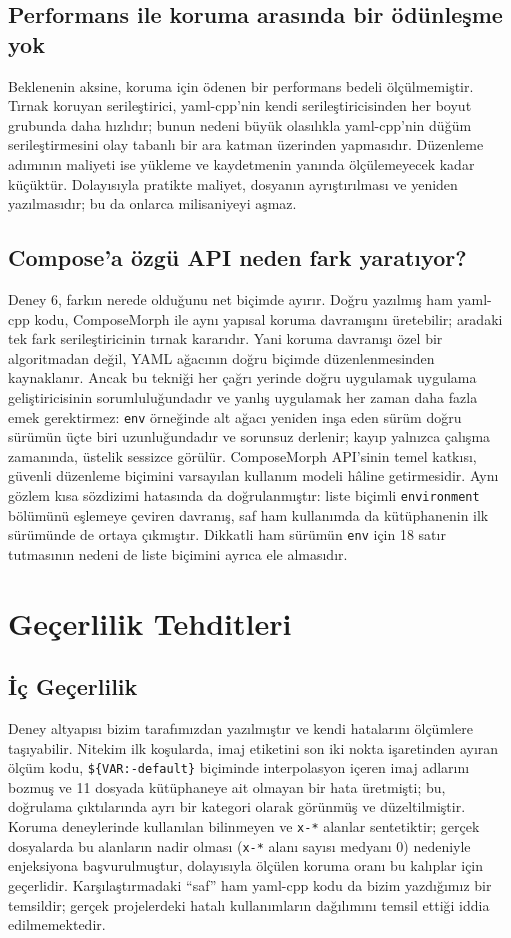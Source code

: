 \documentclass[conference]{IEEEtran}
\begin{document}
\subsection{Performans ile koruma arasında bir ödünleşme yok}
Beklenenin aksine, koruma için ödenen bir performans bedeli ölçülmemiştir.
Tırnak koruyan serileştirici, yaml-cpp'nin kendi serileştiricisinden her
boyut grubunda daha hızlıdır; bunun nedeni büyük olasılıkla yaml-cpp'nin
düğüm serileştirmesini olay tabanlı bir ara katman üzerinden yapmasıdır.
Düzenleme adımının maliyeti ise yükleme ve kaydetmenin yanında ölçülemeyecek
kadar küçüktür. Dolayısıyla pratikte maliyet, dosyanın ayrıştırılması ve
yeniden yazılmasıdır; bu da onlarca milisaniyeyi aşmaz.

\subsection{Compose'a özgü API neden fark yaratıyor?}
Deney 6, farkın nerede olduğunu net biçimde ayırır. Doğru yazılmış ham
yaml-cpp kodu, ComposeMorph ile aynı yapısal koruma davranışını üretebilir;
aradaki tek fark serileştiricinin tırnak kararıdır. Yani koruma davranışı özel bir algoritmadan değil, YAML ağacının doğru biçimde düzenlenmesinden kaynaklanır. Ancak bu
tekniği her çağrı yerinde doğru uygulamak uygulama geliştiricisinin sorumluluğundadır
ve yanlış uygulamak her zaman daha fazla emek gerektirmez: \texttt{env}
örneğinde alt ağacı yeniden inşa eden sürüm doğru sürümün üçte biri
uzunluğundadır ve sorunsuz derlenir; kayıp yalnızca çalışma zamanında,
üstelik sessizce görülür.
ComposeMorph API'sinin temel katkısı, güvenli düzenleme biçimini varsayılan kullanım modeli hâline getirmesidir.
Aynı gözlem kısa sözdizimi hatasında da doğrulanmıştır: liste biçimli
\texttt{environment} bölümünü eşlemeye çeviren davranış, saf ham
kullanımda da kütüphanenin ilk sürümünde de ortaya çıkmıştır. Dikkatli ham
sürümün \texttt{env} için 18 satır tutmasının nedeni de liste biçimini
ayrıca ele almasıdır.

\section{Geçerlilik Tehditleri}
\label{sec:gecerlilik}

\subsection{İç Geçerlilik}
Deney altyapısı bizim tarafımızdan yazılmıştır ve kendi hatalarını
ölçümlere taşıyabilir. Nitekim ilk koşularda, imaj etiketini son iki nokta
işaretinden ayıran ölçüm kodu, \texttt{\$\{VAR:-default\}} biçiminde
interpolasyon içeren imaj adlarını bozmuş ve 11 dosyada kütüphaneye ait
olmayan bir hata üretmişti; bu, doğrulama çıktılarında ayrı bir kategori
olarak görünmüş ve düzeltilmiştir. Koruma deneylerinde kullanılan
bilinmeyen ve \texttt{x-*} alanlar sentetiktir; gerçek dosyalarda bu
alanların nadir olması (\texttt{x-*} alanı sayısı medyanı 0) nedeniyle
enjeksiyona başvurulmuştur, dolayısıyla ölçülen koruma oranı bu kalıplar
için geçerlidir. Karşılaştırmadaki ``saf'' ham yaml-cpp kodu da bizim
yazdığımız bir temsildir; gerçek projelerdeki hatalı kullanımların
dağılımını temsil ettiği iddia edilmemektedir.
\end{document}

